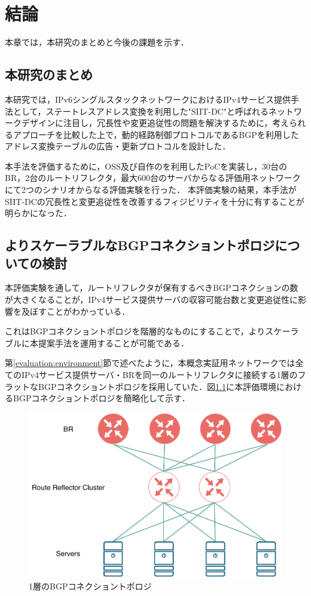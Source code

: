 \chapter{結論}
\label{conclusion}

本章では，本研究のまとめと今後の課題を示す．

\section{本研究のまとめ}
本研究では，IPv6シングルスタックネットワークにおけるIPv4サービス提供手法として，ステートレスアドレス変換を利用した"SIIT-DC"と呼ばれるネットワークデザインに注目し，冗長性や変更追従性の問題を解決するために，考えられるアプローチを比較した上で，動的経路制御プロトコルであるBGPを利用したアドレス変換テーブルの広告・更新プロトコルを設計した．

本手法を評価するために，OSS及び自作のを利用したPoCを実装し，30台のBR，2台のルートリフレクタ，最大600台のサーバからなる評価用ネットワークにて2つのシナリオからなる評価実験を行った．
本評価実験の結果，本手法がSIIT-DCの冗長性と変更追従性を改善するフィジビリティを十分に有することが明らかになった．

\section{よりスケーラブルなBGPコネクショントポロジについての検討}
本評価実験を通して，ルートリフレクタが保有するべきBGPコネクションの数が大きくなることが，IPv4サービス提供サーバの収容可能台数と変更追従性に影響を及ぼすことがわかっている．

これはBGPコネクショントポロジを階層的なものにすることで，よりスケーラブルに本提案手法を運用することが可能である．


第\ref{evaluation:environment}節で述べたように，本概念実証用ネットワークでは全てのIPv4サービス提供サーバ・BRを同一のルートリフレクタに接続する1層のフラットなBGPコネクショントポロジを採用していた．図\ref{fig:1layer_bgp_topology}に本評価環境におけるBGPコネクショントポロジを簡略化して示す．


\begin{figure}[h]
    \begin{center}
    \includegraphics[width=12cm,pagebox=cropbox,clip]{img/1layer_bgp_topology.pdf}
    \end{center}
    \caption{1層のBGPコネクショントポロジ}
    \label{fig:1layer_bgp_topology}
\end{figure}

